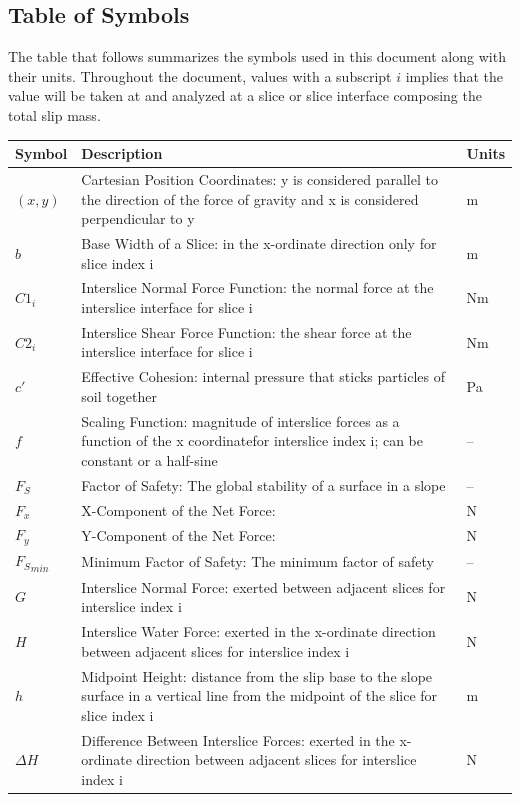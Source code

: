 \documentclass[12pt]{article}
\begin{document}
\subsection{Table of Symbols}
\label{Sec:ToS}
The table that follows summarizes the symbols used in this document along with their units. Throughout the document, values with a subscript $i$ implies that the value will be taken at and analyzed at a slice or slice interface composing the total slip mass.
\begin{longtabu}{l X[l] l}
\toprule
Symbol & Description & Units
\\
\midrule
$(x,y)$ & Cartesian Position Coordinates: y is considered parallel to the direction of the force of gravity and x is considered perpendicular to y & m
\\
$b$ & Base Width of a Slice: in the x-ordinate direction only for slice index i & m
\\
${C1_{i}}$ & Interslice Normal Force Function: the normal force at the interslice interface for slice i & Nm
\\
${C2_{i}}$ & Interslice Shear Force Function: the shear force at the interslice interface for slice i & Nm
\\
$c'$ & Effective Cohesion: internal pressure that sticks particles of soil together & Pa
\\
$f$ & Scaling Function: magnitude of interslice forces as a function of the x coordinatefor interslice index i; can be constant or a half-sine & --
\\
${F_{S}}$ & Factor of Safety: The global stability of a surface in a slope & --
\\
${F_{x}}$ & X-Component of the Net Force:  & N
\\
${F_{y}}$ & Y-Component of the Net Force:  & N
\\
${{F_{S}}_{min}}$ & Minimum Factor of Safety: The minimum factor of safety & --
\\
$G$ & Interslice Normal Force: exerted between adjacent slices for interslice index i & N
\\
$H$ & Interslice Water Force: exerted in the x-ordinate direction between adjacent slices for interslice index i & N
\\
$h$ & Midpoint Height: distance from the slip base to the slope surface in a vertical line from the midpoint of the slice for slice index i & m
\\
$ΔH$ & Difference Between Interslice Forces: exerted in the x-ordinate direction between adjacent slices for interslice index i & N

\end{longtabu}
\end{document}
